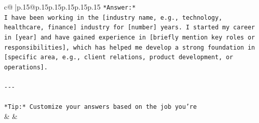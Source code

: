 \documentclass{article}
\begin{document}
{\begin{supertabular}{c@{$\;$}|p{.15\linewidth}@{}p{.15\linewidth}p{.15\linewidth}p{.15\linewidth}p{.15\linewidth}p{.15\linewidth}}
{{{\texttt{*Answer:*  } \\
\texttt{I have been working in the {[}industry name, e.g., technology, healthcare, finance{]} industry for {[}number{]} years. I started my career in {[}year{]} and have gained experience in {[}briefly mention key roles or responsibilities{]}, which has helped me develop a strong foundation in {[}specific area, e.g., client relations, product development, or operations{]}.} \\
\\ 
\texttt{{-}{-}{-}} \\
\\ 
\texttt{*Tip:* Customize your answers based on the job you're} \\
            }
        }
    }
    & & \\ \\


\end{supertabular}}
\end{document}
